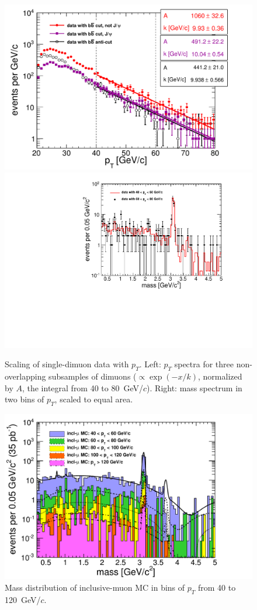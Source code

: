 \documentclass[12pt]{cms-tdr}
\begin{document}
\begin{figure}
\includegraphics[width=0.5\linewidth]{PLOTS/support_bbbarcut_limits.pdf}
\includegraphics[width=0.5\linewidth]{PLOTS/support_limits_mass.pdf}

\caption{Scaling of single-dimuon data with $p_T$.  Left: $p_T$
  spectra for three non-overlapping subsamples of dimuons ($\propto
  \exp(-x/k)$, normalized by $A$, the integral from 40 to 80~GeV/$c$).
  Right: mass spectrum in two bins of $p_T$, scaled to equal
  area. \label{fig:support_bbbarcut_limits}}
\end{figure}

\begin{figure}
\begin{center}
\includegraphics[width=0.6\linewidth]{PLOTS/support_mass_vs_pt.pdf}
\end{center}

\caption{Mass distribution of inclusive-muon MC in bins of $p_T$ from
  40 to 120~GeV/$c$. \label{fig:support_mass_vs_pt}}
\end{figure}
\end{document}

